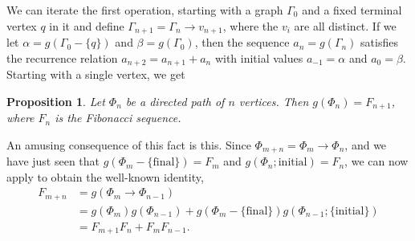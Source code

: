 \documentclass[a4paper, 12pt]{article}
\newenvironment{enumrealm}{\setlength{\abovedisplayskip}{5pt}
\setlength{\belowdisplayskip}{5pt}}{\setlength{\abovedisplayskip}{10.0pt plus 2.0pt minus 5.0pt}
\setlength{\belowdisplayskip}{10.0pt plus 2.0pt minus 5.0pt}}
\newcommand{\fibo}[1]{F_{#1}}
\newcommand{\hthref}[1]{\hyperref[#1]{\thref{#1}}}
\theoremstyle{plain}
\newtheorem{prop}{Proposition}[section]
\theoremstyle{definition}
\begin{document}
We can iterate the first operation, starting with a graph $\Gamma_0$ and a fixed terminal vertex $q$ in it and define $\Gamma_{n + 1} = \Gamma_{n} \rightarrow v_{n + 1}$, where the $v_i$ are all distinct. If we let $\alpha = g(\Gamma_0 - \{q\})$ and $\beta = g(\Gamma_0)$, then the sequence $a_n = g(\Gamma_n)$ satisfies the recurrence relation $a_{n + 2} = a_{n + 1} + a_{n}$ with initial values $a_{-1} = \alpha$ and $a_0 = \beta$. Starting with a single vertex, we get

\begin{prop}
	Let $\Phi_n$ be a directed path of $n$ vertices. Then $g(\Phi_n) = \fibo{n + 1}$, where $\fibo{n}$ is the Fibonacci sequence.
\end{prop}

An amusing consequence of this fact is this. Since $\Phi_{m + n} = \Phi_m \rightarrow \Phi_n$, and we have just seen that $g(\Phi_m - \{\text{final}\}) = \fibo{m}$ and $g(\Phi_n; \text{initial}) = \fibo{n}$, 
we can now apply \hyperref[eustick]{\hthref{eustick}} to obtain the well-known identity, \begin{enumrealm}
\begin{align*}
	\fibo{m + n} &= g(\Phi_m \rightarrow \Phi_{n - 1}) \\
	&= g(\Phi_m)g(\Phi_{n - 1}) + g(\Phi_m - \{\text{final}\})g(\Phi_{n - 1}; \{\text{initial}\}) \\
	&= \fibo{m + 1}\fibo{n} + \fibo{m}\fibo{n - 1}.
\end{align*}\end{enumrealm}
\vspace{-\baselineskip}
\end{document}
